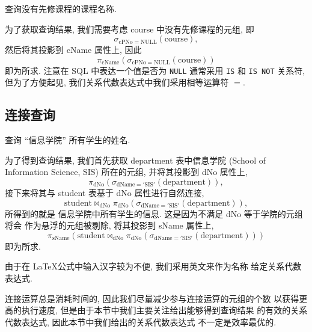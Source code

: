 \documentclass[10pt,UTF8]{book} %
\begin{document}
\begin{example}
    查询没有先修课程的课程名称.
    \begin{sol}
        为了获取查询结果, 我们需要考虑 course 中没有先修课程的元组, 即
        \[ \sigma_{\mathrm{cPNo = NULL}}(\mathrm{course}), \]
        然后将其投影到 cName 属性上, 因此
        \[ \pi_{\mathrm{cName}}\left(
            \sigma_{\mathrm{cPNo = NULL}}(\mathrm{course})
        \right) \]
        即为所求. 注意在 SQL 中表达一个值是否为 \lstinline|NULL| 通常采用
        \lstinline|IS| 和 \lstinline|IS NOT| 关系符, 但为了方便起见,
        我们关系代数表达式中我们采用相等运算符 $=$.
    \end{sol}
\end{example}

\subsection{连接查询}

\begin{example}
    查询 “信息学院” 所有学生的姓名.
    \begin{sol}
        为了得到查询结果, 我们首先获取 department 表中信息学院
        (School of Information Science, SIS)
        所在的元组,
        并将其投影到 dNo 属性上,
        \[ \pi_\mathrm{dNo}\left(
            \sigma_\mathrm{dName='SIS'} (\mathrm{department})
        \right),\]
        接下来将其与 student 表基于 dNo 属性进行自然连接, 
        \[ \mathrm{student} \Join_\mathrm{dNo}
        \pi_\mathrm{dNo}\left(
            \sigma_\mathrm{dName='SIS'} (\mathrm{department})
        \right), \]
        所得到的就是
        信息学院中所有学生的信息. 这是因为不满足 dNo 等于学院的元组将会
        作为悬浮的元组被剔除,
        将其投影到 sName 属性上,
        \[ \pi_\mathrm{sName} \left(
            \mathrm{student} \Join_\mathrm{dNo}
        \pi_\mathrm{dNo}\left(
            \sigma_\mathrm{dName='SIS'} (\mathrm{department})
        \right)
        \right) \]
        即为所求.
    \end{sol}
    \begin{cmt}
        由于在 \LaTeX 公式中输入汉字较为不便, 我们采用英文来作为名称
        给定关系代数表达式.
    \end{cmt}
    \begin{cmt}
        连接运算总是消耗时间的, 因此我们尽量减少参与连接运算的元组的个数
        以获得更高的执行速度, 但是由于本节中我们主要关注给出能够得到查询结果
        的有效的关系代数表达式, 因此本节中我们给出的关系代数表达式
        不一定是效率最优的.
    \end{cmt}
\end{example}
\end{document}
